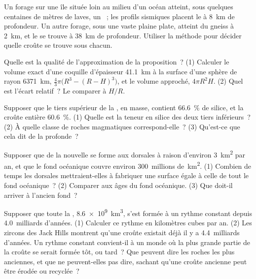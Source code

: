 \begin{exercise}[$\star\star$]\label{exo:g12:continental-crust:11}
Un forage sur une île située loin au milieu d'un océan atteint, sous
quelques centaines de mètres de laves, un ~; les profils sismiques
placent le  à \qty{8}{km} de profondeur. Un autre forage, sous une
vaste plaine plate, atteint du gneiss à \qty{2}{km}, et le  se trouve à
\qty{38}{km} de profondeur. Utiliser la méthode pour décider quelle croûte
se trouve sous chacun.
\end{exercise}

\begin{exercise}[$\star\star\star$]\label{exo:g12:continental-crust:12}
Quelle est la qualité de l'approximation de la proposition~? (1) Calculer
le volume exact d'une coquille d'épaisseur \qty{41.1}{km} à la surface
d'une sphère de rayon \qty{6371}{km},
$\tfrac{4}{3}\pi\bigl(R^3 - (R - H)^3\bigr)$, et le volume approché,
$4\pi R^2 H$. (2) Quel est l'écart relatif~? Le comparer à $H/R$.
\end{exercise}

\begin{exercise}[$\star\star\star$]\label{exo:g12:continental-crust:13}
Supposer que le tiers supérieur de la , en masse,
contient \qty{66.6}{\percent} de silice, et la croûte entière
\qty{60.6}{\percent}. (1) Quelle est la teneur en silice des deux tiers
inférieurs~? (2) À quelle classe de roches magmatiques correspond-elle~?
(3) Qu'est-ce que cela dit de la  profonde~?
\end{exercise}

\begin{exercise}[$\star\star\star$]\label{exo:g12:continental-crust:14}
Supposer que de la  nouvelle se forme aux dorsales à
raison d'environ \qty{3}{km^2} par an, et que le fond océanique couvre
environ \num{300}~millions de~\unit{km^2}. (1) Combien de temps les
dorsales mettraient-elles à fabriquer une surface égale à celle de tout le
fond océanique~? (2) Comparer aux âges du fond océanique. (3) Que doit-il
arriver à l'ancien fond~?
\end{exercise}

\begin{exercise}[$\star\star\star$]\label{exo:g12:continental-crust:15}
Supposer que toute la , \qty{8.6e9}{km^3}, s'est formée
à un rythme constant depuis 4.0~milliards d'années. (1) Calculer ce rythme
en kilomètres cubes par an. (2) Les zircons des Jack Hills montrent qu'une
croûte existait déjà il y a 4.4~milliards d'années. Un rythme constant
convient-il à un monde où la plus grande partie de la croûte se serait
formée tôt, ou tard~? Que peuvent dire les roches les plus anciennes, et
que ne peuvent-elles pas dire, sachant qu'une croûte ancienne peut être
érodée ou recyclée~?
\end{exercise}

